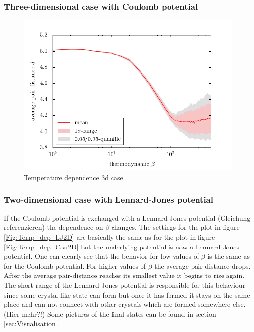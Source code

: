 \documentclass[11pt, a4paper]{article}
\numberwithin{equation}{section}
\newcommand{\remark}[1]{{\color{red}(#1)}}
\begin{document}
\subsubsection{Three-dimensional case with Coulomb potential}
\begin{figure}
	\centering
	\includegraphics{./figures/temp_dep_coulomb3d.pdf}
	\caption{Temperature dependence 3d case}
\end{figure}


\subsubsection{Two-dimensional case with Lennard-Jones potential}
If the Coulomb potential is exchanged with a Lennard-Jones potential \remark{Gleichung referenzieren} the dependence on $\beta$ changes.
The settings for the plot in figure \ref{Fig:Temp_dep_LJ2D} are basically the same as for the plot in figure \ref{Fig:Temp_dep_Cou2D} but the underlying potential is now a Lennard-Jones potential.
One can clearly see that the behavior for low values of $\beta$ is the same as for the Coulomb potential.
For higher values of $\beta$ the average pair-distance drops.
After the average pair-distance reaches its smallest value it begins to rise again.
The short range of the Lennard-Jones potential is responsible for this behaviour since some crystal-like state can form but once it has formed it stays on the same place and can not connect with other crystals which are formed somewhere else. \remark{Hier mehr?!}
Some pictures of the final states can be found in section \ref{sec:Visualisation}.
\end{document}
